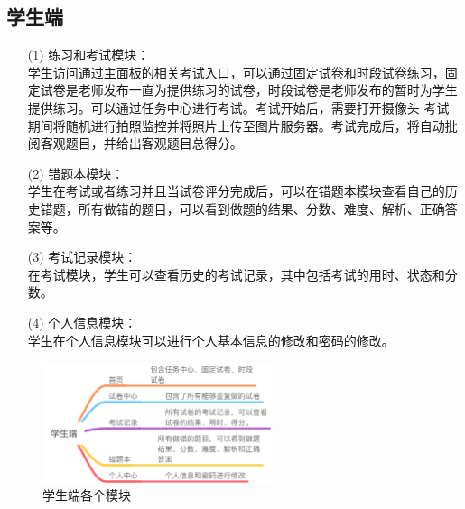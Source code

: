 \subsection{学生端}
\begin{enumerate}
	\item[(1)] 练习和考试模块：\\
	学生访问通过主面板的相关考试入口，可以通过固定试卷和时段试卷练习，固定试卷是老师发布一直为提供练习的试卷，时段试卷是老师发布的暂时为学生提供练习。可以通过任务中心进行考试。考试开始后，需要打开摄像头
考试期间将随机进行拍照监控并将照片上传至图片服务器。考试完成后，将自动批阅客观题目，并给出客观题目总得分。
	\item[(2)] 错题本模块：\\
	学生在考试或者练习并且当试卷评分完成后，可以在错题本模块查看自己的历史错题，所有做错的题目，可以看到做题的结果、分数、难度、解析、正确答案等。
	\item[(3)] 考试记录模块：\\
	在考试模块，学生可以查看历史的考试记录，其中包括考试的用时、状态和分数。
	\item[(4)] 个人信息模块：\\
	学生在个人信息模块可以进行个人基本信息的修改和密码的修改。
\end{enumerate}
\begin{figure}[!htbp]
\centering
\includegraphics[width=0.6\textwidth,keepaspectratio]{data/chapter-3/xueshengduan.png}
\caption{学生端各个模块}
\label{figure:student}
\end{figure}


